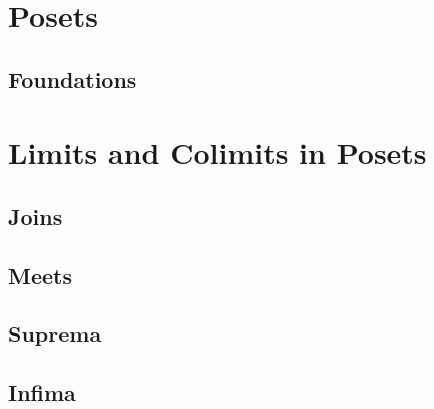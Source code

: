 \ChapterTableOfContents

\section{Posets}\label{section-posets}
\subsection{Foundations}\label{subsection-posets-foundations}
\section{Limits and Colimits in Posets}\label{section-limits-and-colimits-in-posets}
\subsection{Joins}\label{subsection-joins-in-posets}
\subsection{Meets}\label{subsection-meets-in-posets}
\subsection{Suprema}\label{subsection-suprema-in-posets}
\subsection{Infima}\label{subsection-infima-in-posets}
\begin{appendices}

\end{appendices}

